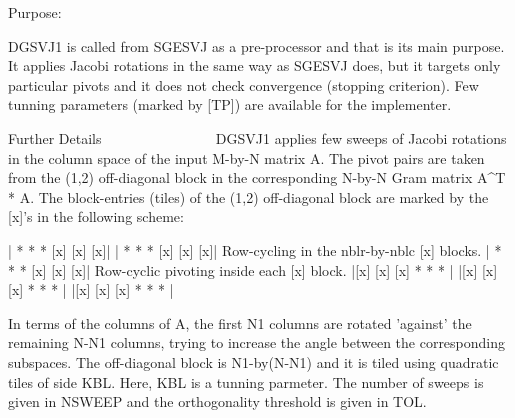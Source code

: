  \begin{DoxyParagraph}{Purpose\+: }
\begin{DoxyVerb} DGSVJ1 is called from SGESVJ as a pre-processor and that is its main
 purpose. It applies Jacobi rotations in the same way as SGESVJ does, but
 it targets only particular pivots and it does not check convergence
 (stopping criterion). Few tunning parameters (marked by [TP]) are
 available for the implementer.

 Further Details
 ~~~~~~~~~~~~~~~
 DGSVJ1 applies few sweeps of Jacobi rotations in the column space of
 the input M-by-N matrix A. The pivot pairs are taken from the (1,2)
 off-diagonal block in the corresponding N-by-N Gram matrix A^T * A. The
 block-entries (tiles) of the (1,2) off-diagonal block are marked by the
 [x]'s in the following scheme:

    | *  *  * [x] [x] [x]|
    | *  *  * [x] [x] [x]|    Row-cycling in the nblr-by-nblc [x] blocks.
    | *  *  * [x] [x] [x]|    Row-cyclic pivoting inside each [x] block.
    |[x] [x] [x] *  *  * |
    |[x] [x] [x] *  *  * |
    |[x] [x] [x] *  *  * |

 In terms of the columns of A, the first N1 columns are rotated 'against'
 the remaining N-N1 columns, trying to increase the angle between the
 corresponding subspaces. The off-diagonal block is N1-by(N-N1) and it is
 tiled using quadratic tiles of side KBL. Here, KBL is a tunning parmeter.
 The number of sweeps is given in NSWEEP and the orthogonality threshold
 is given in TOL.\end{DoxyVerb}
 
\end{DoxyParagraph}

